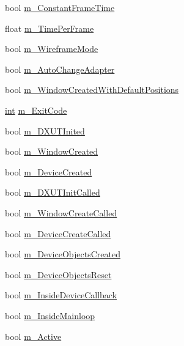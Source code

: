 \begin{DoxyCompactItemize}
bool \hyperlink{struct_d_x_u_t_state_1_1_s_t_a_t_e_a783529e74698e9a454c88bd5dc2a8b36}{m\_\-ConstantFrameTime}
\item 
float \hyperlink{struct_d_x_u_t_state_1_1_s_t_a_t_e_a88cc5ed3a6c278d8878729cb31807d38}{m\_\-TimePerFrame}
\item 
bool \hyperlink{struct_d_x_u_t_state_1_1_s_t_a_t_e_a0525b4dffa98dd3f8f6a13b59e8af4d8}{m\_\-WireframeMode}
\item 
bool \hyperlink{struct_d_x_u_t_state_1_1_s_t_a_t_e_a617e6fad467d4ccb7963c19e9d537bc0}{m\_\-AutoChangeAdapter}
\item 
bool \hyperlink{struct_d_x_u_t_state_1_1_s_t_a_t_e_a1016f7d74385e9d74b86c6d8fe53176a}{m\_\-WindowCreatedWithDefaultPositions}
\item 
\hyperlink{_d_x_u_tgui_8cpp_a2d77ed03302b6978834ee3b6f57837fb}{int} \hyperlink{struct_d_x_u_t_state_1_1_s_t_a_t_e_a1dedc3714536cb7954de952fe221f7fa}{m\_\-ExitCode}
\item 
bool \hyperlink{struct_d_x_u_t_state_1_1_s_t_a_t_e_a9ef59c151afeabfcf8c59657f4ee9185}{m\_\-DXUTInited}
\item 
bool \hyperlink{struct_d_x_u_t_state_1_1_s_t_a_t_e_a1de1e982998068a26fb2f72bfdcecc0f}{m\_\-WindowCreated}
\item 
bool \hyperlink{struct_d_x_u_t_state_1_1_s_t_a_t_e_a9def0bbc1bc5041a1bb9eac3acd827db}{m\_\-DeviceCreated}
\item 
bool \hyperlink{struct_d_x_u_t_state_1_1_s_t_a_t_e_a85bf29ec5f98b4e374af1dce6fe3fa70}{m\_\-DXUTInitCalled}
\item 
bool \hyperlink{struct_d_x_u_t_state_1_1_s_t_a_t_e_ac091b80c8b43d3ace8727ec1a4f80739}{m\_\-WindowCreateCalled}
\item 
bool \hyperlink{struct_d_x_u_t_state_1_1_s_t_a_t_e_ad6f5ae475a74910a91a3cd7135f02d93}{m\_\-DeviceCreateCalled}
\item 
bool \hyperlink{struct_d_x_u_t_state_1_1_s_t_a_t_e_a41d6b2d15094f73f67d98d334fc1ff90}{m\_\-DeviceObjectsCreated}
\item 
bool \hyperlink{struct_d_x_u_t_state_1_1_s_t_a_t_e_a49a95ffd1f51f36569ee02f8cbb98387}{m\_\-DeviceObjectsReset}
\item 
bool \hyperlink{struct_d_x_u_t_state_1_1_s_t_a_t_e_a98f9ed14122518b35b876881f8f88a8f}{m\_\-InsideDeviceCallback}
\item 
bool \hyperlink{struct_d_x_u_t_state_1_1_s_t_a_t_e_a5d976e8529a81a647dc689887ee248bb}{m\_\-InsideMainloop}
\item 
bool \hyperlink{struct_d_x_u_t_state_1_1_s_t_a_t_e_a40f0adbabbd1742c8a53f1d1db879b26}{m\_\-Active}

\end{DoxyCompactItemize}
